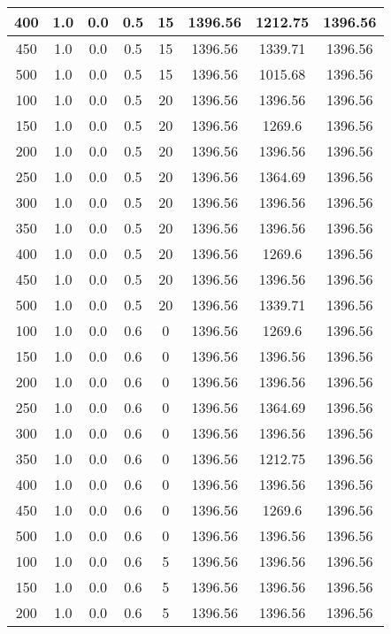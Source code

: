 \documentclass[a4paper, 12pt]{extreport}
\begin{document}
\begin{itemize}
\begin{longtable}{|c|c|c|c|c|c|c|c|}
			400 & 1.0 & 0.0 & 0.5 & 15 & 1396.56 & 1212.75 & 1396.56 \\\hline
			450 & 1.0 & 0.0 & 0.5 & 15 & 1396.56 & 1339.71 & 1396.56 \\\hline
			500 & 1.0 & 0.0 & 0.5 & 15 & 1396.56 & 1015.68 & 1396.56 \\\hline
			100 & 1.0 & 0.0 & 0.5 & 20 & 1396.56 & 1396.56 & 1396.56 \\\hline
			150 & 1.0 & 0.0 & 0.5 & 20 & 1396.56 & 1269.6 & 1396.56 \\\hline
			200 & 1.0 & 0.0 & 0.5 & 20 & 1396.56 & 1396.56 & 1396.56 \\\hline
			250 & 1.0 & 0.0 & 0.5 & 20 & 1396.56 & 1364.69 & 1396.56 \\\hline
			300 & 1.0 & 0.0 & 0.5 & 20 & 1396.56 & 1396.56 & 1396.56 \\\hline
			350 & 1.0 & 0.0 & 0.5 & 20 & 1396.56 & 1396.56 & 1396.56 \\\hline
			400 & 1.0 & 0.0 & 0.5 & 20 & 1396.56 & 1269.6 & 1396.56 \\\hline
			450 & 1.0 & 0.0 & 0.5 & 20 & 1396.56 & 1396.56 & 1396.56 \\\hline
			500 & 1.0 & 0.0 & 0.5 & 20 & 1396.56 & 1339.71 & 1396.56 \\\hline
			100 & 1.0 & 0.0 & 0.6 & 0 & 1396.56 & 1269.6 & 1396.56 \\\hline
			150 & 1.0 & 0.0 & 0.6 & 0 & 1396.56 & 1396.56 & 1396.56 \\\hline
			200 & 1.0 & 0.0 & 0.6 & 0 & 1396.56 & 1396.56 & 1396.56 \\\hline
			250 & 1.0 & 0.0 & 0.6 & 0 & 1396.56 & 1364.69 & 1396.56 \\\hline
			300 & 1.0 & 0.0 & 0.6 & 0 & 1396.56 & 1396.56 & 1396.56 \\\hline
			350 & 1.0 & 0.0 & 0.6 & 0 & 1396.56 & 1212.75 & 1396.56 \\\hline
			400 & 1.0 & 0.0 & 0.6 & 0 & 1396.56 & 1396.56 & 1396.56 \\\hline
			450 & 1.0 & 0.0 & 0.6 & 0 & 1396.56 & 1269.6 & 1396.56 \\\hline
			500 & 1.0 & 0.0 & 0.6 & 0 & 1396.56 & 1396.56 & 1396.56 \\\hline
			100 & 1.0 & 0.0 & 0.6 & 5 & 1396.56 & 1396.56 & 1396.56 \\\hline
			150 & 1.0 & 0.0 & 0.6 & 5 & 1396.56 & 1396.56 & 1396.56 \\\hline
			200 & 1.0 & 0.0 & 0.6 & 5 & 1396.56 & 1396.56 & 1396.56 \\\hline

\end{longtable}
\end{itemize}
\end{document}
